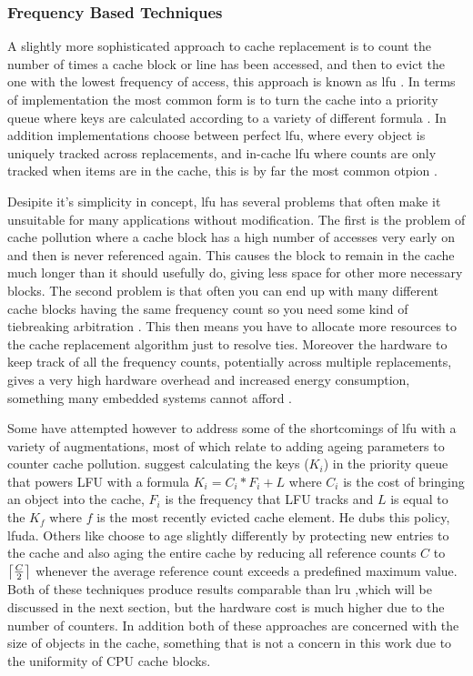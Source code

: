 \subsubsection{Frequency Based Techniques}

A slightly more sophisticated approach to cache replacement is to count the number of times a cache block or line has been accessed, and then to evict the one with the lowest frequency of access, this approach is known as \gls{lfu} . In terms of implementation the most common form is to turn the cache into a priority queue where keys are calculated according to a variety of different formula \cite{podlipnigSurveyWebCache2003}. In addition implementations choose between perfect \gls{lfu}, where every object is uniquely tracked across replacements, and in-cache \gls{lfu} where counts are only tracked when items are in the cache, this is by far the most common otpion \cite{podlipnigSurveyWebCache2003}.

Desipite it's simplicity in concept, \gls{lfu} has several problems that often make it unsuitable for many applications without modification. The first is the problem of cache pollution \cite{karedlaCachingStrategiesImprove1994} where a cache block has a high number of accesses very early on and then is never referenced again. This causes the block to remain in the cache much longer than it should usefully do, giving less space for other more necessary blocks. The second problem is that often you can end up with many different cache blocks having the same frequency count so you need some kind of tiebreaking arbitration \cite{podlipnigSurveyWebCache2003}. This then means you  have to allocate more resources to the cache replacement algorithm just to resolve ties. Moreover the hardware to keep track of all the frequency counts, potentially across multiple replacements, gives a very high hardware overhead and increased energy consumption, something many embedded systems cannot afford \cite{pandaSurveyReplacementStrategies2016}. 

Some have attempted however to address some of the shortcomings of \gls{lfu} with a variety of augmentations, most of which relate to adding ageing parameters to counter cache pollution. \citet{arlittEvaluatingContentManagement2000} suggest calculating the keys ($K_i$) in the priority queue that powers LFU with a formula $K_i = C_i * F_i + L$ where $C_i$ is the cost of bringing an object into the cache, $F_i$ is the frequency that LFU tracks and $L$ is equal to the $K_f$ where $f$ is the most recently evicted cache element. He dubs this policy, \gls{lfuda}. Others like \citet{robinsonDataCacheManagement1990} choose to age slightly differently by protecting new entries to the cache and also aging the entire cache by reducing all reference counts $C$ to $\ceil[\big]{\frac{C}{2}}$ whenever the average reference count exceeds a predefined maximum value. Both of these techniques produce results comparable than \gls{lru} ,which will be discussed in the next section, but the hardware cost is much higher due to the number of counters. In addition both of these approaches are concerned with the size of objects in the cache, something that is not a concern in this work due to the uniformity of CPU cache blocks.

